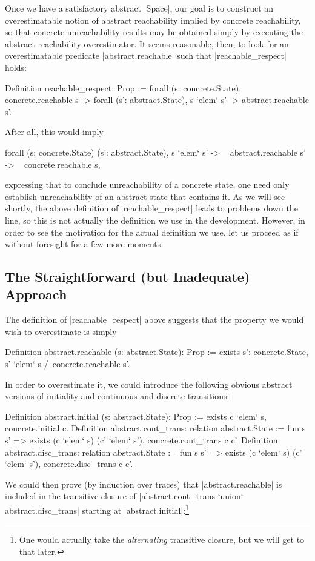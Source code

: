 \documentclass[runningheads]{llncs}
\begin{document}

Once we have a satisfactory abstract |Space|, our goal is to construct an overestimatable notion of abstract reachability implied by concrete reachability, so that concrete unreachability results may be obtained simply by executing the abstract reachability overestimator. It seems reasonable, then, to look for an overestimatable predicate |abstract.reachable| such that |reachable_respect| holds:
\begin{code}
Definition reachable_respect: Prop :=
  forall (s: concrete.State), concrete.reachable s ->
    forall (s': abstract.State), s `elem` s' -> abstract.reachable s'.
\end{code}
After all, this would imply
\begin{code}
forall (s: concrete.State) (s': abstract.State),
   s `elem` s' -> ~ abstract.reachable s' -> ~ concrete.reachable s,
\end{code}
expressing that to conclude unreachability of a concrete state, one need only establish unreachability of an abstract state that contains it. As we will see shortly, the above definition of |reachable_respect| leads to problems down the line, so this is not actually the definition we use in the development. However, in order to see the motivation for the actual definition we use, let us proceed as if without foresight for a few more moments.

\subsection{The Straightforward (but Inadequate) Approach}
\label{straightforward}

The definition of |reachable_respect| above suggests that the property we would wish to overestimate is simply
\begin{code}
Definition abstract.reachable (s: abstract.State): Prop
  := exists s': concrete.State, s' `elem` s /\ concrete.reachable s'.
\end{code}
In order to overestimate it, we could introduce the following obvious abstract versions of initiality and continuous and discrete transitions:
\begin{code}
  Definition abstract.initial (s: abstract.State): Prop
    := exists c `elem` s, concrete.initial c.
  Definition abstract.cont_trans: relation abstract.State
    := fun s s' => exists (c `elem` s) (c' `elem` s'), concrete.cont_trans c c'.
  Definition abstract.disc_trans: relation abstract.State
    := fun s s' => exists (c `elem` s) (c' `elem` s'), concrete.disc_trans c c'.
\end{code}
We could then prove (by induction over traces) that |abstract.reachable| is included in the transitive closure of |abstract.cont_trans `union` abstract.disc_trans| starting at |abstract.initial|:\footnote{One would actually take the \emph{alternating} transitive closure, but we will get to that later.}
\end{document}
